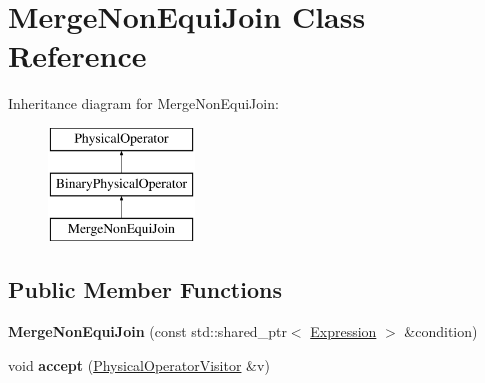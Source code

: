 \hypertarget{class_merge_non_equi_join}{\section{Merge\+Non\+Equi\+Join Class Reference}
\label{class_merge_non_equi_join}
}
Inheritance diagram for Merge\+Non\+Equi\+Join\+:\begin{figure}[H]
\begin{center}
\leavevmode
\includegraphics[height=3.000000cm]{class_merge_non_equi_join}
\end{center}
\end{figure}
\subsection*{Public Member Functions}
\begin{DoxyCompactItemize}
\item 
\hypertarget{class_merge_non_equi_join_a3e7a12e0e21a2bf755608c9bc2e5d4ed}{{\bfseries Merge\+Non\+Equi\+Join} (const std\+::shared\+\_\+ptr$<$ \hyperlink{class_expression}{Expression} $>$ \&condition)}\label{class_merge_non_equi_join_a3e7a12e0e21a2bf755608c9bc2e5d4ed}

\item 
\hypertarget{class_merge_non_equi_join_a117ec79e9941977b4f90c65bea5cea65}{void {\bfseries accept} (\hyperlink{class_physical_operator_visitor}{Physical\+Operator\+Visitor} \&v)}\label{class_merge_non_equi_join_a117ec79e9941977b4f90c65bea5cea65}

\end{DoxyCompactItemize}
